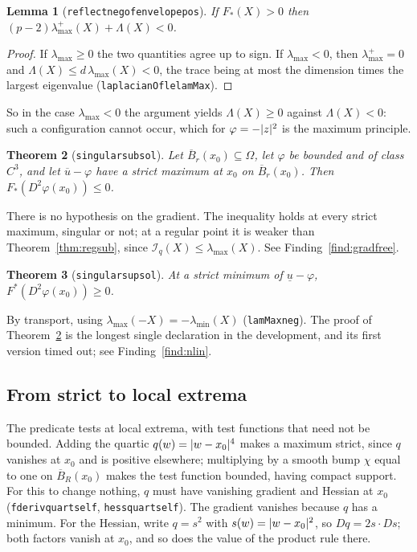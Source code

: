 \documentclass[11pt,reqno]{amsart}
\newcommand{\LEANREF}[1]{\texttt{\small\def\_{\textunderscore\allowbreak}#1}}
\DeclarePairedDelimiter{\abs}{\lvert}{\rvert}
\theoremstyle{plain}
\newtheorem{theorem}{Theorem}[section]
\newtheorem{lemma}[theorem]{Lemma}
\theoremstyle{definition}
\begin{document}
\begin{lemma}[\LEANREF{reflect\_neg\_of\_envelope\_pos}]\label{lem:reflectneg}
If $F_*(X) > 0$ then $(p-2)\lambda_{\max}^+(X) + \Lambda(X) < 0$.
\end{lemma}

\begin{proof}
If $\lambda_{\max} \ge 0$ the two quantities agree up to sign. If
$\lambda_{\max} < 0$, then $\lambda_{\max}^+ = 0$ and
$\Lambda(X) \le d\,\lambda_{\max}(X) < 0$, the trace being at most the
dimension times the largest eigenvalue (\LEANREF{laplacianOf\_le\_lamMax}).
\end{proof}

So in the case $\lambda_{\max} < 0$ the argument yields $\Lambda(X) \ge 0$
against $\Lambda(X) < 0$: such a configuration cannot occur, which for
$\varphi = -\abs{z}^2$ is the maximum principle.

\begin{theorem}[\LEANREF{singular\_subsol}]\label{thm:singsub}
Let $\overline{B}_r(x_0) \subseteq \Omega$, let $\varphi$ be bounded and of
class $C^3$, and let $\overline{u} - \varphi$ have a strict maximum at $x_0$ on
$\overline{B}_r(x_0)$. Then $F_*(D^2\varphi(x_0)) \le 0$.
\end{theorem}

There is no hypothesis on the gradient. The inequality holds at every strict
maximum, singular or not; at a regular point it is weaker than
Theorem~\ref{thm:regsub}, since $\mathcal{I}_q(X) \le \lambda_{\max}(X)$. See
Finding~\ref{find:gradfree}.

\begin{theorem}[\LEANREF{singular\_supsol}]\label{thm:singsup}
At a strict minimum of $\underline{u} - \varphi$,
$F^*(D^2\varphi(x_0)) \ge 0$.
\end{theorem}

By transport, using $\lambda_{\max}(-X) = -\lambda_{\min}(X)$
(\LEANREF{lamMax\_neg}). The proof of Theorem~\ref{thm:singsub} is the longest
single declaration in the development, and its first version timed out; see
Finding~\ref{find:nlin}.

\subsection{From strict to local extrema}\label{ssec:strict}

The predicate tests at local extrema, with test functions that need not be
bounded. Adding the quartic $q(w) = \abs{w - x_0}^4$ makes a maximum strict,
since $q$ vanishes at $x_0$ and is positive elsewhere; multiplying by a smooth
bump $\chi$ equal to one on $\overline{B}_R(x_0)$ makes the test function
bounded, having compact support. For this to change nothing, $q$ must have
vanishing gradient and Hessian at $x_0$ (\LEANREF{fderiv\_quart\_self},
\LEANREF{hess\_quart\_self}). The gradient vanishes because $q$ has a minimum.
For the Hessian, write $q = s^2$ with $s(w) = \abs{w - x_0}^2$, so
$Dq = 2s\cdot Ds$; both factors vanish at $x_0$, and so does the value of the
product rule there.
\end{document}
